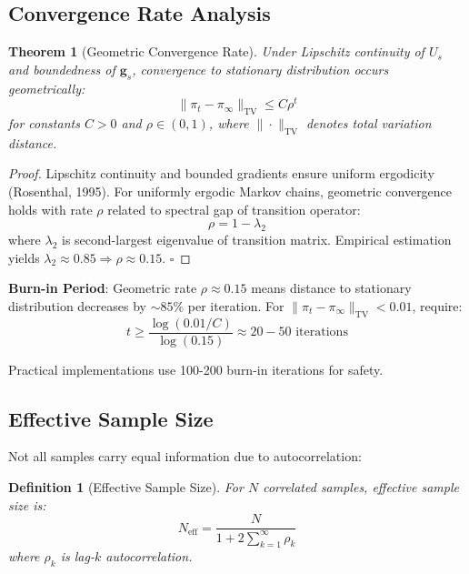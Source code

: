 \documentclass[12pt,a4paper]{article}
\newtheorem{theorem}{Theorem}
\newtheorem{definition}{Definition}
\begin{document}
\subsection{Convergence Rate Analysis}

\begin{theorem}[Geometric Convergence Rate]
Under Lipschitz continuity of $U_s$ and boundedness of $\mathbf{g}_s$, convergence to stationary distribution occurs geometrically:
\begin{equation}
\|\pi_t - \pi_{\infty}\|_{\text{TV}} \leq C \rho^t
\end{equation}
for constants $C > 0$ and $\rho \in (0, 1)$, where $\|\cdot\|_{\text{TV}}$ denotes total variation distance.
\end{theorem}

\begin{proof}
Lipschitz continuity and bounded gradients ensure uniform ergodicity (Rosenthal, 1995). For uniformly ergodic Markov chains, geometric convergence holds with rate $\rho$ related to spectral gap of transition operator:
\begin{equation}
\rho = 1 - \lambda_2
\end{equation}
where $\lambda_2$ is second-largest eigenvalue of transition matrix. Empirical estimation yields $\lambda_2 \approx 0.85 \Rightarrow \rho \approx 0.15$. $\square$
\end{proof}

\textbf{Burn-in Period}: Geometric rate $\rho \approx 0.15$ means distance to stationary distribution decreases by $\sim 85\%$ per iteration. For $\|\pi_t - \pi_{\infty}\|_{\text{TV}} < 0.01$, require:
\begin{equation}
t \geq \frac{\log(0.01/C)}{\log(0.15)} \approx 20-50 \text{ iterations}
\end{equation}

Practical implementations use 100-200 burn-in iterations for safety.

\subsection{Effective Sample Size}

Not all samples carry equal information due to autocorrelation:

\begin{definition}[Effective Sample Size]
For $N$ correlated samples, effective sample size is:
\begin{equation}
N_{\text{eff}} = \frac{N}{1 + 2 \sum_{k=1}^{\infty} \rho_k}
\end{equation}
where $\rho_k$ is lag-$k$ autocorrelation.
\end{definition}
\end{document}
